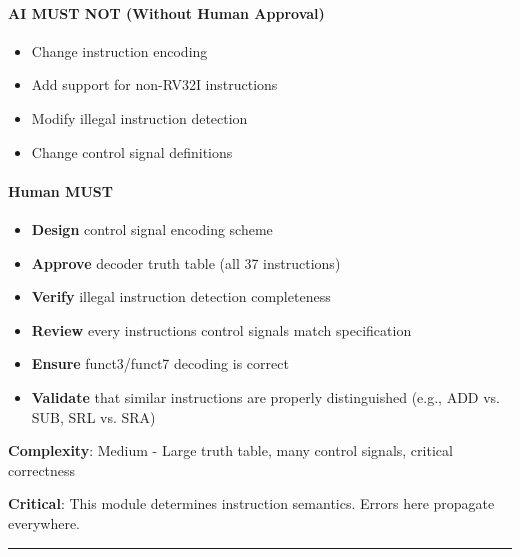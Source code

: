 \paragraph{\texorpdfstring{\warn{} AI MUST NOT (Without Human
Approval)}{ AI MUST NOT (Without Human Approval)}}\label{cr:status:phase1-ai-human-responsibilities:warning-ai-must-not-without-human-approval-3}

\begin{record}

\begin{itemize}
\tightlist
\item
  Change instruction encoding
\item
  Add support for non-RV32I instructions
\item
  Modify illegal instruction detection
\item
  Change control signal definitions
\end{itemize}

\end{record}

\paragraph{\texorpdfstring{\hold{} Human MUST}{ Human MUST}}\label{cr:status:phase1-ai-human-responsibilities:raised-hand-human-must-3}

\begin{record}

\begin{itemize}
\tightlist
\item
  \textbf{Design} control signal encoding scheme
\item
  \textbf{Approve} decoder truth table (all 37 instructions)
\item
  \textbf{Verify} illegal instruction detection completeness
\item
  \textbf{Review} every instruction\textquotesingle s control signals
  match specification
\item
  \textbf{Ensure} funct3/\allowbreak{}funct7 decoding is correct
\item
  \textbf{Validate} that similar instructions are properly distinguished
  (e.g., ADD vs. SUB, SRL vs. SRA)
\end{itemize}

\textbf{Complexity}: \partialmark{} Medium - Large truth table, many
control signals, critical correctness

\textbf{Critical}: This module determines instruction semantics. Errors
here propagate everywhere.

\begin{center}\rule{0.5\linewidth}{0.5pt}\end{center}

\end{record}

